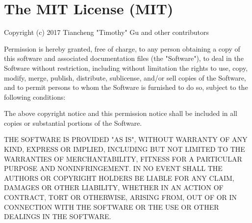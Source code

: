 \chapter{The MIT License (MIT)}
\hypertarget{md_pkiclassroomrescheduler_2src_2main_2frontend_2node__modules_2w3c-hr-time_2_l_i_c_e_n_s_e}{}\label{md_pkiclassroomrescheduler_2src_2main_2frontend_2node__modules_2w3c-hr-time_2_l_i_c_e_n_s_e}
\label{md_pkiclassroomrescheduler_2src_2main_2frontend_2node__modules_2w3c-hr-time_2_l_i_c_e_n_s_e_autotoc_md26454}%
%
 Copyright (c) 2017 Tiancheng "{}\+Timothy"{} Gu and other contributors

Permission is hereby granted, free of charge, to any person obtaining a copy of this software and associated documentation files (the "{}\+Software"{}), to deal in the Software without restriction, including without limitation the rights to use, copy, modify, merge, publish, distribute, sublicense, and/or sell copies of the Software, and to permit persons to whom the Software is furnished to do so, subject to the following conditions\+:

The above copyright notice and this permission notice shall be included in all copies or substantial portions of the Software.

THE SOFTWARE IS PROVIDED "{}\+AS IS"{}, WITHOUT WARRANTY OF ANY KIND, EXPRESS OR IMPLIED, INCLUDING BUT NOT LIMITED TO THE WARRANTIES OF MERCHANTABILITY, FITNESS FOR A PARTICULAR PURPOSE AND NONINFRINGEMENT. IN NO EVENT SHALL THE AUTHORS OR COPYRIGHT HOLDERS BE LIABLE FOR ANY CLAIM, DAMAGES OR OTHER LIABILITY, WHETHER IN AN ACTION OF CONTRACT, TORT OR OTHERWISE, ARISING FROM, OUT OF OR IN CONNECTION WITH THE SOFTWARE OR THE USE OR OTHER DEALINGS IN THE SOFTWARE. 